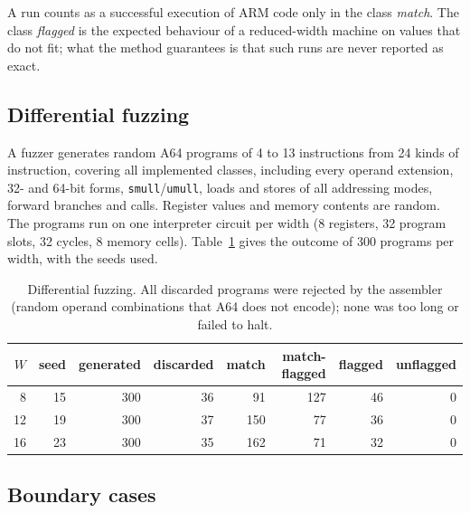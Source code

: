 \documentclass[11pt]{article}
\begin{document}
\noindent A run counts as a successful execution of ARM code only in the class \emph{match}.
The class \emph{flagged} is the expected behaviour of a reduced-width machine on values that do not
fit; what the method guarantees is that such runs are never reported as exact.

\subsection{Differential fuzzing}

A fuzzer generates random A64 programs of 4 to 13 instructions from 24 kinds of instruction,
covering all implemented classes, including every operand extension, 32- and 64-bit forms,
\texttt{smull}/\texttt{umull}, loads and stores of all addressing modes, forward branches and calls.
Register values and memory contents are random. The programs run on one interpreter circuit per
width (8 registers, 32 program slots, 32 cycles, 8 memory cells). Table~\ref{tab:fuzz} gives the
outcome of 300 programs per width, with the seeds used.

\begin{table}[H]
\centering
\small
\begin{tabular}{@{}rrrrrrrr@{}}
\toprule
$W$ & seed & generated & discarded & match & match-flagged & flagged & unflagged \\
\midrule
8  & 15 & 300 & 36 & 91  & 127 & 46 & 0 \\
12 & 19 & 300 & 37 & 150 & 77  & 36 & 0 \\
16 & 23 & 300 & 35 & 162 & 71  & 32 & 0 \\
\bottomrule
\end{tabular}
\caption{Differential fuzzing. All discarded programs were rejected by the assembler (random
operand combinations that A64 does not encode); none was too long or failed to halt.}
\label{tab:fuzz}
\end{table}

\subsection{Boundary cases}
\end{document}
